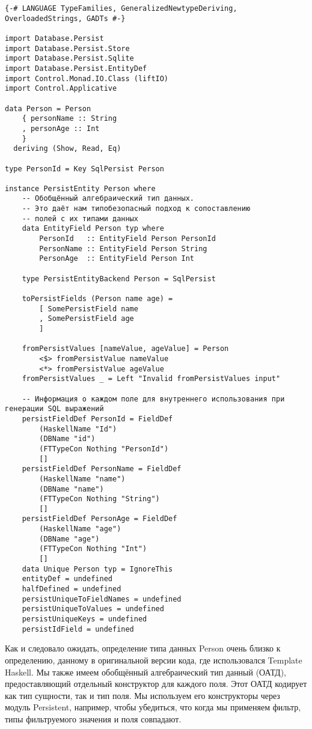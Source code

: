 \begin{lstlisting}
{-# LANGUAGE TypeFamilies, GeneralizedNewtypeDeriving, OverloadedStrings, GADTs #-}

import Database.Persist
import Database.Persist.Store
import Database.Persist.Sqlite
import Database.Persist.EntityDef
import Control.Monad.IO.Class (liftIO)
import Control.Applicative

data Person = Person
    { personName :: String
    , personAge :: Int
    }
  deriving (Show, Read, Eq)

type PersonId = Key SqlPersist Person

instance PersistEntity Person where
    -- Обобщённый алгебраический тип данных.
    -- Это даёт нам типобезопасный подход к сопоставлению
    -- полей с их типами данных
    data EntityField Person typ where
        PersonId   :: EntityField Person PersonId
        PersonName :: EntityField Person String
        PersonAge  :: EntityField Person Int

    type PersistEntityBackend Person = SqlPersist

    toPersistFields (Person name age) =
        [ SomePersistField name
        , SomePersistField age
        ]

    fromPersistValues [nameValue, ageValue] = Person
        <$> fromPersistValue nameValue
        <*> fromPersistValue ageValue
    fromPersistValues _ = Left "Invalid fromPersistValues input"

    -- Информация о каждом поле для внутреннего использования при генерации SQL выражений
    persistFieldDef PersonId = FieldDef
        (HaskellName "Id")
        (DBName "id")
        (FTTypeCon Nothing "PersonId")
        []
    persistFieldDef PersonName = FieldDef
        (HaskellName "name")
        (DBName "name")
        (FTTypeCon Nothing "String")
        []
    persistFieldDef PersonAge = FieldDef
        (HaskellName "age")
        (DBName "age")
        (FTTypeCon Nothing "Int")
        []
    data Unique Person typ = IgnoreThis
    entityDef = undefined
    halfDefined = undefined
    persistUniqueToFieldNames = undefined
    persistUniqueToValues = undefined
    persistUniqueKeys = undefined
    persistIdField = undefined
\end{lstlisting}

Как и следовало ожидать, определение типа данных Person очень близко к
определению, данному в оригинальной версии кода, где использовался Template
Haskell. Мы также имеем обобщённый алгебраический тип данный (ОАТД),
предоставляющий отдельный конструктор для каждого поля. Этот ОАТД кодирует как
тип сущности, так и тип поля. Мы используем его конструкторы через модуль
Persistent, например, чтобы убедиться, что когда мы применяем фильтр, типы
фильтруемого значения и поля совпадают.

